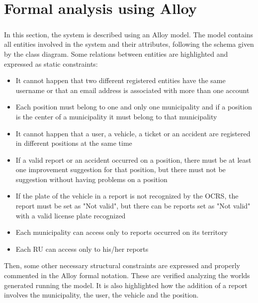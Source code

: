 \chapter{Formal analysis using Alloy}
	\paragraph{}
		In this section, the system is described using an Alloy model.
		The model contains all entities involved in the system and their attributes, following the schema given by the class diagram.
		Some relations between entities are highlighted and expressed as static constraints:
		\begin{itemize}
			\item It cannot happen that two different registered entities have the same username or that an email address is associated with more than one account
			\item Each position must belong to one and only one municipality and if a position is the center of a municipality it must belong to that municipality
			\item It cannot happen that a user, a vehicle, a ticket or an accident are registered in different positions at the same time
			\item If a valid report or an accident occurred on a position, there must be at least one improvement suggestion for that position, but there must not be suggestion without having problems on a position
			\item If the plate of the vehicle in a report is not recognized by the OCRS, the report must be set as "Not valid", but there can be reports set as "Not valid" with a valid license plate recognized
			\item Each municipality can access only to reports occurred on its territory
			\item Each RU can access only to his/her reports
		\end{itemize}
		
		Then, some other necessary structural constraints are expressed and properly commented in the Alloy formal notation. These are verified analyzing the worlds generated running the model.
		It is also highlighted how the addition of a report involves the municipality, the user, the vehicle and the position.
		\clearpage
